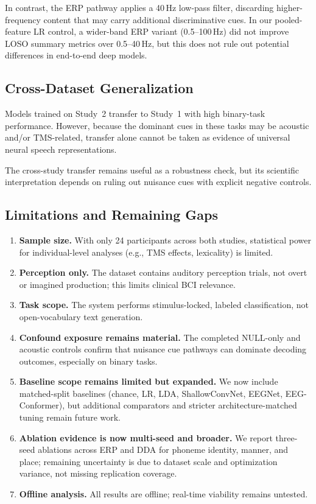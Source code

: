 \documentclass[11pt,a4paper]{article}
\begin{document}
In contrast, the ERP pathway applies a 40\,Hz low-pass filter, discarding
higher-frequency content that may carry additional discriminative cues. In our
pooled-feature LR control, a wider-band ERP variant (0.5--100\,Hz) did not
improve LOSO summary metrics over 0.5--40\,Hz, but this does not rule out
potential differences in end-to-end deep models.

\subsection{Cross-Dataset Generalization}

Models trained on Study~2 transfer to Study~1 with high binary-task
performance. However, because the dominant cues in these tasks may be acoustic
and/or TMS-related, transfer alone cannot be taken as evidence of universal
neural speech representations.

The cross-study transfer remains useful as a robustness check, but its
scientific interpretation depends on ruling out nuisance cues with explicit
negative controls.

\subsection{Limitations and Remaining Gaps}

\begin{enumerate}
  \item \textbf{Sample size.} With only 24 participants across both studies,
    statistical power for individual-level analyses (e.g., TMS effects,
    lexicality) is limited.
  \item \textbf{Perception only.} The dataset contains auditory perception
    trials, not overt or imagined production; this limits clinical BCI
    relevance.
  \item \textbf{Task scope.} The system performs stimulus-locked, labeled
    classification, not open-vocabulary text generation.
  \item \textbf{Confound exposure remains material.} The completed NULL-only
    and acoustic controls confirm that nuisance cue pathways can dominate
    decoding outcomes, especially on binary tasks.
  \item \textbf{Baseline scope remains limited but expanded.} We now include
    matched-split baselines (chance, LR, LDA, ShallowConvNet, EEGNet,
    EEG-Conformer), but additional comparators and stricter
    architecture-matched tuning remain future work.
  \item \textbf{Ablation evidence is now multi-seed and broader.} We report
    three-seed ablations across ERP and DDA for phoneme identity, manner, and
    place; remaining uncertainty is due to dataset scale and optimization
    variance, not missing replication coverage.
  \item \textbf{Offline analysis.} All results are offline; real-time
    viability remains untested.
\end{enumerate}
\end{document}
